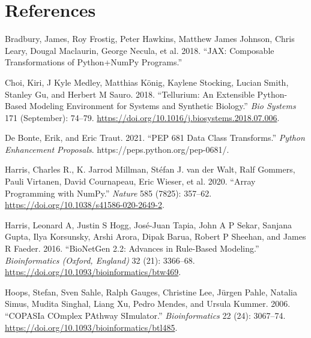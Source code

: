 \documentclass[
  a4paper,
  DIV=11,
  numbers=noendperiod]{scrartcl}
\newlength{\cslhangindent}
\newlength{\cslentryspacingunit} %
\newenvironment{CSLReferences}[2] %
 {%
  \setlength{\parindent}{0pt}
  \ifodd #1
  \let\oldpar\par
  \def\par{\hangindent=\cslhangindent\oldpar}
  \fi
  \setlength{\parskip}{#2\cslentryspacingunit}
 }%
 {}
\begin{document}
\hypertarget{references}{%
\section{References}\label{references}}

\hypertarget{refs}{}
\begin{CSLReferences}{1}{0}
\leavevmode{}%
Bradbury, James, Roy Frostig, Peter Hawkins, Matthew James Johnson,
Chris Leary, Dougal Maclaurin, George Necula, et al. 2018. {``{JAX}:
Composable Transformations of {Python}+{NumPy} Programs.''}

\leavevmode{}%
Choi, Kiri, J Kyle Medley, Matthias König, Kaylene Stocking, Lucian
Smith, Stanley Gu, and Herbert M Sauro. 2018. {``Tellurium: {An}
Extensible Python-Based Modeling Environment for Systems and Synthetic
Biology.''} \emph{Bio Systems} 171 (September): 74--79.
\url{https://doi.org/10.1016/j.biosystems.2018.07.006}.

\leavevmode{}%
De Bonte, Erik, and Eric Traut. 2021. {``{PEP} 681 {\textendash} {Data
Class Transforms}.''} \emph{Python Enhancement Proposals}.
https://peps.python.org/pep-0681/.

\leavevmode{}%
Harris, Charles R., K. Jarrod Millman, Stéfan J. van der Walt, Ralf
Gommers, Pauli Virtanen, David Cournapeau, Eric Wieser, et al. 2020.
{``Array Programming with {NumPy}.''} \emph{Nature} 585 (7825): 357--62.
\url{https://doi.org/10.1038/s41586-020-2649-2}.

\leavevmode{}%
Harris, Leonard A, Justin S Hogg, José-Juan Tapia, John A P Sekar,
Sanjana Gupta, Ilya Korsunsky, Arshi Arora, Dipak Barua, Robert P
Sheehan, and James R Faeder. 2016. {``{BioNetGen} 2.2: Advances in
Rule-Based Modeling.''} \emph{Bioinformatics (Oxford, England)} 32 (21):
3366--68. \url{https://doi.org/10.1093/bioinformatics/btw469}.

\leavevmode{}%
Hoops, Stefan, Sven Sahle, Ralph Gauges, Christine Lee, Jürgen Pahle,
Natalia Simus, Mudita Singhal, Liang Xu, Pedro Mendes, and Ursula
Kummer. 2006. {``{COPASI}{\textemdash}a {COmplex PAthway SImulator}.''}
\emph{Bioinformatics} 22 (24): 3067--74.
\url{https://doi.org/10.1093/bioinformatics/btl485}.


\end{CSLReferences}
\end{document}
